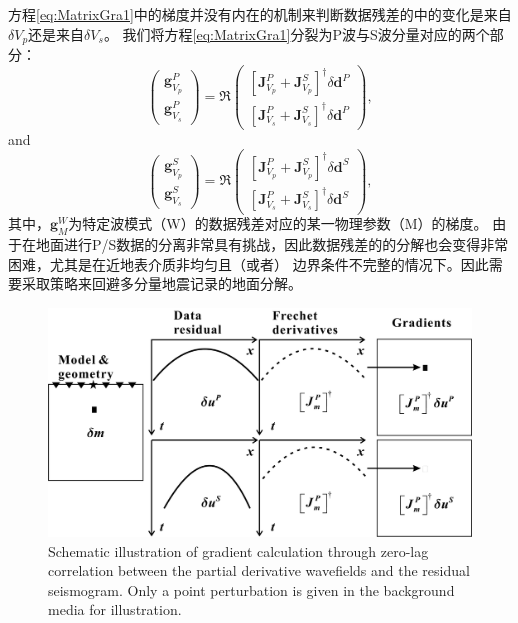 方程\eqref{eq:MatrixGra1}中的梯度并没有内在的机制来判断数据残差的中的变化是来自$\delta V_p$还是来自$\delta V_s$。
我们将方程\eqref{eq:MatrixGra1}分裂为P波与S波分量对应的两个部分：
\begin{equation}
        \begin{pmatrix}
                \mathbf{g}^P_{V_p}\\
                \mathbf{g}^P_{V_s}
        \end{pmatrix}
        =\mathfrak{R}\begin{pmatrix}
                [\mathbf{J}^P_{V_p}+\mathbf{J}^S_{V_p}]^{\dagger}\delta \mathbf{d}^P\\
                [\mathbf{J}^P_{V_s}+\mathbf{J}^S_{V_s}]^{\dagger}\delta \mathbf{d}^P
        \end{pmatrix},
        \label{eq:DEMatrixGraP}
\end{equation}
and
\begin{equation}
        \begin{pmatrix}
                \mathbf{g}^S_{V_p}\\
                \mathbf{g}^S_{V_s}
        \end{pmatrix}
        =\mathfrak{R}\begin{pmatrix}
                [\mathbf{J}^P_{V_p}+\mathbf{J}^S_{V_p}]^{\dagger}\delta \mathbf{d}^S\\
                [\mathbf{J}^P_{V_s}+\mathbf{J}^S_{V_s}]^{\dagger}\delta \mathbf{d}^S
        \end{pmatrix},
        \label{eq:DEMatrixGraS}
\end{equation}
其中，$\mathbf{g}^W_M$为特定波模式（W）的数据残差对应的某一物理参数（M）的梯度。
由于在地面进行P/S数据的分离非常具有挑战，因此数据残差的的分解也会变得非常困难，尤其是在近地表介质非均匀且（或者）
边界条件不完整的情况下。因此需要采取策略来回避多分量地震记录的地面分解。
\begin{figure}
    \begin{center}
        \includegraphics[width=1.0\textwidth]{Figure/chapter02/finalMarmousiII/Fig/zerolagLAST1.pdf}
        \caption{
Schematic illustration of gradient calculation through zero-lag correlation
 between the partial derivative wavefields
and the residual seismogram.
Only a point perturbation is given in the background media for illustration.
    }
    \label{fig:crossterm}
    \end{center}
\end{figure}


